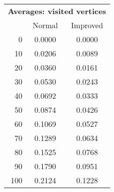 \begin{tabular}{r|cc}
      \multicolumn{3}{c}{{\bf Averages: visited vertices }} \\
      & Normal & Improved \\ \hline\hline
0
& 0.0000
& 0.0000
\\
10
& 0.0206
& 0.0089
\\
20
& 0.0360
& 0.0161
\\
30
& 0.0530
& 0.0243
\\
40
& 0.0692
& 0.0333
\\
50
& 0.0874
& 0.0426
\\
60
& 0.1069
& 0.0527
\\
70
& 0.1289
& 0.0634
\\
80
& 0.1525
& 0.0768
\\
90
& 0.1790
& 0.0951
\\
100
& 0.2124
& 0.1228
\\
\end{tabular}
